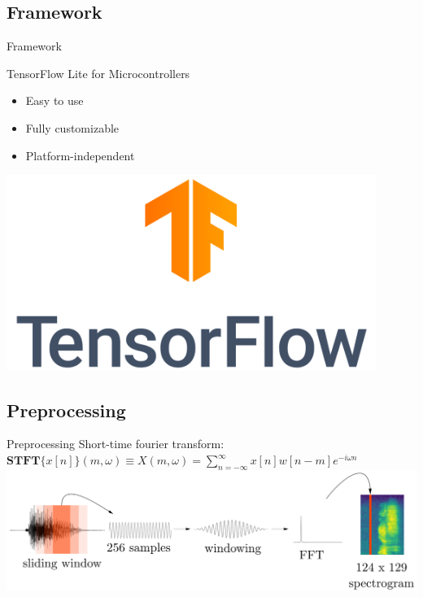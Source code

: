 \documentclass{beamer}
\begin{document}
\subsection{Framework}
\begin{frame}{Framework}

TensorFlow Lite for Microcontrollers
\begin{minipage}{0.5\textwidth}
	\begin{itemize}
		\item<2->Easy to use
		\item<3->Fully customizable
		\item<4->Platform-independent
	\end{itemize}
	\end{minipage}
	\begin{minipage}{0.48\textwidth}
		\includegraphics[width=0.9\textwidth]{figures/tensorflow.png}
	\end{minipage}

\end{frame}

\subsection{Preprocessing}
\begin{frame}{Preprocessing}
	Short-time fourier transform:\\[2mm]

$\mathbf{STFT}\{x[n]\}(m,\omega)\equiv X(m,\omega) =
\sum_{n=-\infty}^{\infty} x[n]w[n-m]e^{-i \omega n}$
	\includegraphics[width=\textwidth]{figures/stft.png}
\end{frame}
\end{document}
